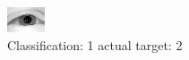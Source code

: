 \begin{figure}[h!]
\begin{center}
\includegraphics[width=0.60\columnwidth]{figures/ID2376_class_1_target_2.png}
\end{center}
\caption{ Classification: 1 actual target: 2}
\label{fig:ID2376_class_1_target_2}
\end{figure}
